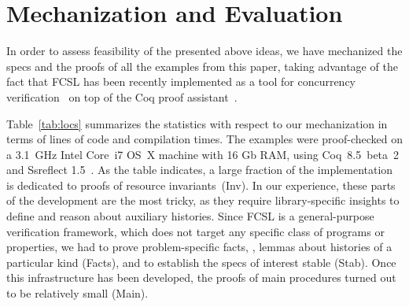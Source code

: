 
\section{Mechanization and Evaluation}
\label{sec:evaluation}

%

In order to assess feasibility of the presented above ideas, we have
mechanized the specs and the proofs of all the examples from this
paper, taking advantage of the fact that FCSL has been recently
implemented as a tool for concurrency
verification~\cite{Sergey-al:PLDI15} on top of the Coq proof
assistant~\cite{Coq-manual}.

Table~\ref{tab:locs} summarizes the statistics with respect to our
mechanization in terms of lines of code and compilation times. 
%
The examples were proof-checked on a 3.1~GHz Intel Core~i7 OS~X
machine with 16 Gb RAM, using Coq~8.5~beta~2 and Ssreflect
1.5~\cite{Gonthier-al:TR}.
%
As the table indicates, a large fraction of the implementation is
dedicated to proofs of resource invariants~(\textsf{Inv}).
%
In our experience, these parts of the development are the most tricky,
as they require library-specific insights to define and reason about
auxiliary histories.
%
Since FCSL is a general-purpose verification framework, which does not
target any specific class of programs or properties, we had to prove
problem-specific facts, \eg, lemmas about histories of a particular
kind (\textsf{Facts}), and to establish the specs of interest stable
(\textsf{Stab}). Once this infrastructure has been developed, the
proofs of main procedures turned out to be relatively small
(\textsf{Main}).
%
%

